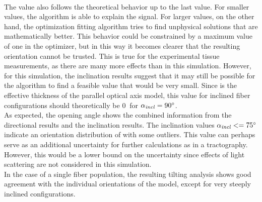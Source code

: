 \\
%
The \trel{} value also follows the theoretical behavior up to the last value.
For smaller \trel{} values, the algorithm is able to explain the signal.
For larger \trel{} values, on the other hand, the optimization fitting algorithm tries to find unphysical solutions that are mathematically better.
This behavior could be constrained by a maximum \trel{} value of one in the optimizer, but in this way it becomes clearer that the resulting orientation cannot be trusted.
This is true for the experimental tissue measurements, as there are many more effects than in this simulation.
However, for this simulation, the inclination results suggest that it may still be possible for the algorithm to find a feasible \trel{} value that would be very small.
Since \trel{} is the effective thickness of the parallel optical axis model, this value for inclined fiber configurations should theoretically be $\SI{0}{}$ for $\textnormal{$\alpha_{\mathit{incl}}$}=\SI{90}{\degree}$.
\\
%
As expected, the opening angle shows the combined information from the directional results and the inclination results.
The inclination values $\textnormal{$\alpha_{\mathit{incl}}$} <= \SI{75}{\degree}$ indicate an orientation distribution of \dummy{} with some outliers.
This value can perhaps serve as an additional uncertainty for further calculations as in a tractography.
However, this would be a lower bound on the uncertainty since effects of light scattering are not considered in this simulation.
\\
%
In the case of a single fiber population, the resulting tilting analysis shows good agreement with the individual orientations of the model, except for very steeply inclined configurations.
%
